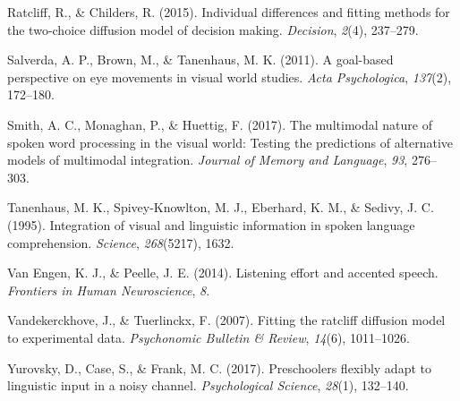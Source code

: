 \documentclass[10pt, letterpaper]{article}
\begin{document}
\hypertarget{ref-ratcliff2015individual}{}
Ratcliff, R., \& Childers, R. (2015). Individual differences and fitting
methods for the two-choice diffusion model of decision making.
\emph{Decision}, \emph{2}(4), 237--279.

\hypertarget{ref-salverda2011goal}{}
Salverda, A. P., Brown, M., \& Tanenhaus, M. K. (2011). A goal-based
perspective on eye movements in visual world studies. \emph{Acta
Psychologica}, \emph{137}(2), 172--180.

\hypertarget{ref-smith2017multimodal}{}
Smith, A. C., Monaghan, P., \& Huettig, F. (2017). The multimodal nature
of spoken word processing in the visual world: Testing the predictions
of alternative models of multimodal integration. \emph{Journal of Memory
and Language}, \emph{93}, 276--303.

\hypertarget{ref-tanenhaus1995integration}{}
Tanenhaus, M. K., Spivey-Knowlton, M. J., Eberhard, K. M., \& Sedivy, J.
C. (1995). Integration of visual and linguistic information in spoken
language comprehension. \emph{Science}, \emph{268}(5217), 1632.

\hypertarget{ref-van2014listening}{}
Van Engen, K. J., \& Peelle, J. E. (2014). Listening effort and accented
speech. \emph{Frontiers in Human Neuroscience}, \emph{8}.

\hypertarget{ref-vandekerckhove2007fitting}{}
Vandekerckhove, J., \& Tuerlinckx, F. (2007). Fitting the ratcliff
diffusion model to experimental data. \emph{Psychonomic Bulletin \&
Review}, \emph{14}(6), 1011--1026.

\hypertarget{ref-yurovsky2017preschoolers}{}
Yurovsky, D., Case, S., \& Frank, M. C. (2017). Preschoolers flexibly
adapt to linguistic input in a noisy channel. \emph{Psychological
Science}, \emph{28}(1), 132--140.
\end{document}
